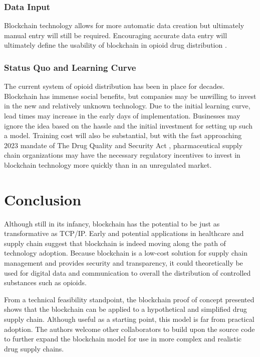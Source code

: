 \documentclass[sigconf]{acmart}
\begin{document}
\subsubsection{Data Input} Blockchain technology allows for more automatic data creation but ultimately manual entry will still be required. Encouraging accurate data entry will ultimately define the usability of blockchain in opioid drug distribution \cite{hitchingHealthcare}.

\subsubsection{Status Quo and Learning Curve} The current system of opioid distribution has been in place for decades. Blockchain has immense social benefits, but companies may be unwilling to invest in the new and relatively unknown technology. Due to the initial learning curve, lead times may increase in the early days of implementation. Businesses may ignore the idea based on the hassle and the initial investment for setting up such a model. Training cost will also be substantial, but with the fast approaching 2023 mandate of The Drug Quality and Security Act \cite{DQASA}, pharmaceutical supply chain organizations may have the necessary regulatory incentives to invest in blockchain technology more quickly than in an unregulated market. 





\section{Conclusion}
Although still in its infancy, blockchain has the potential to be just as transformative as TCP/IP. Early and potential applications in healthcare and supply chain suggest that blockchain is indeed moving along the path of technology adoption. Because blockchain is a low-cost solution for supply chain management and provides security and transparency, it could theoretically be used for digital data and communication to overall the distribution of controlled substances such as opioids.

From a technical feasibility standpoint, the blockchain proof of concept presented shows that the blockchain can be applied to a hypothetical and simplified drug supply chain. Although useful as a starting point, this model is far from practical adoption. The authors welcome other collaborators to build upon the source code to further expand the blockchain model for use in more complex and realistic drug supply chains.
\end{document}
